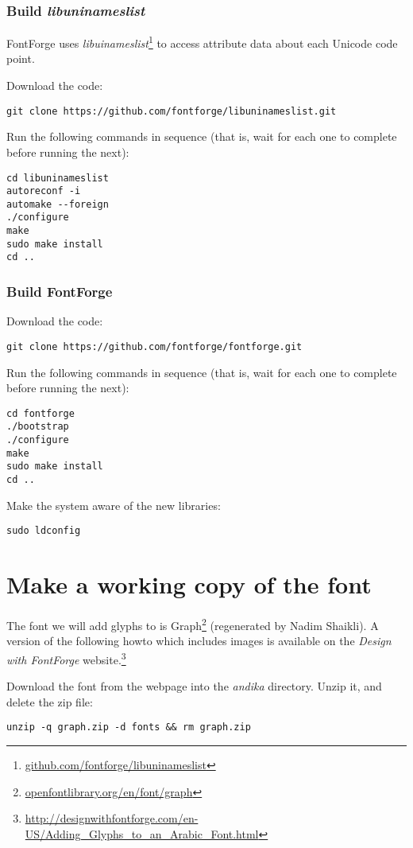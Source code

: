 \subsubsection{Build \textit{libuninameslist}}

FontForge uses \textit{libuinameslist}\footnote{\url{github.com/fontforge/libuninameslist}} to access attribute data about each Unicode code point.

Download the code:

\verb|git clone https://github.com/fontforge/libuninameslist.git|

Run the following commands in sequence (that is, wait for each one to complete before running the next):
\begin{verbatim}
cd libuninameslist
autoreconf -i
automake --foreign
./configure
make
sudo make install
cd ..
\end{verbatim}

\subsubsection{Build FontForge}

Download the code:

\verb|git clone https://github.com/fontforge/fontforge.git|

Run the following commands in sequence (that is, wait for each one to complete before running the next):
\begin{verbatim}
cd fontforge
./bootstrap
./configure
make
sudo make install
cd ..
\end{verbatim}

Make the system aware of the new libraries:

\verb|sudo ldconfig|


\section{Make a working copy of the font}

The font we will add glyphs to is Graph\footnote{\url{openfontlibrary.org/en/font/graph}} (regenerated by Nadim Shaikli).  A version of the following howto which includes images is available on the \textit{Design with FontForge} website.\footnote{\url{http://designwithfontforge.com/en-US/Adding_Glyphs_to_an_Arabic_Font.html}}

Download the font from the webpage into the \textit{andika} directory.  Unzip it, and delete the zip file:

\verb|unzip -q graph.zip -d fonts && rm graph.zip|

